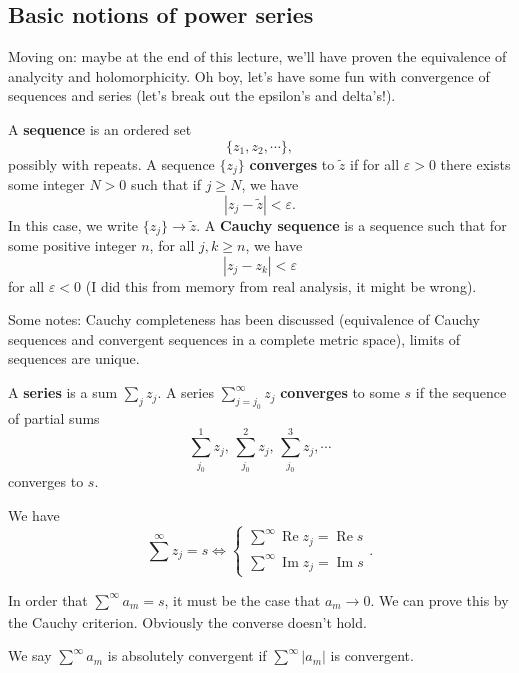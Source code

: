 \subsection{Basic notions of power series}
Moving on: maybe at the end of this lecture, we'll have proven the equivalence of analycity and holomorphicity. Oh boy, let's have some fun with convergence of sequences and series (let's break out the epsilon's and delta's!).
\begin{definition}[Sequence]
    A \textbf{sequence} is an ordered set \[
    \{z_1,z_2,\cdots \} ,
    \] possibly with repeats. A sequence $\{z_j\} $ \textbf{converges} to $\widetilde z$ 
    if for all $\varepsilon >0$ there exists some integer $N>0$ such that if $j\geq N$, we have \[
    |z_j -\widetilde z|<\varepsilon .
    \] In this case, we write $\{z_j \} \to \widetilde z$. A \textbf{Cauchy sequence} is a sequence such that for some positive integer $n$, for all $j,k\geq n$, we have \[
    |z_j -z_k|<\varepsilon 
\] for all $\varepsilon <0$ (I did this from memory from real analysis, it might be wrong).
\end{definition}
Some notes: Cauchy completeness has been discussed (equivalence of Cauchy sequences and convergent sequences in a complete metric space), limits of sequences are unique.
\begin{definition}[Series]
    A \textbf{series} is a sum $\sum_{j}^{} z_j $. A series $\sum_{j=j_0}^{\infty} z_j $ \textbf{converges} to some $s$ if the sequence of partial sums \[
    \sum_{j_0}^{1} z_j ,\, \sum_{j_0}^{2} z_j ,\, \sum_{j_0}^{3} z_j , \cdots 
    \] converges to $s$.
\end{definition}
\begin{theorem}
    We have\[
        \sum_{}^{\infty} z_j =s\iff
    \begin{cases}
       \sum_{}^{\infty} \operatorname{Re}z_j =\operatorname{Re}s\\
       \sum_{}^{\infty} \operatorname{Im}z_j =\operatorname{Im}s
    \end{cases}.
    \] 
\end{theorem}
\begin{note}
    In order that $\sum_{}^{\infty} a_m=s$, it must be the case that $a_m\to 0$. We can prove this by the Cauchy criterion. Obviously the converse doesn't hold.
\end{note}
\begin{definition}
    We say $\sum_{}^{\infty} a_m$ is absolutely convergent if $\sum_{}^{\infty} |a_m|$ is convergent. 
\end{definition}
